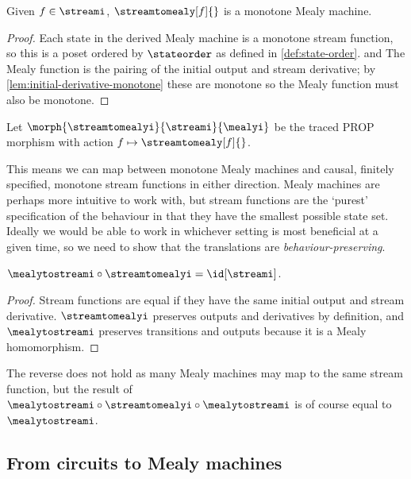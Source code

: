 \documentclass{lmcs}
\begin{document}
\begin{lem}\label{lem:stream-to-mealy-is-monotone}
    Given \(f \in \streami\), \(\streamtomealy[f]{}\) is
    a monotone Mealy machine.
\end{lem}
\begin{proof}
    Each state in the derived Mealy machine is a monotone stream function, so
    this is a poset ordered by \(\stateorder\) as defined in
    \autoref{def:state-order}. and
    The Mealy function is the pairing of the initial output and stream
    derivative; by \autoref{lem:initial-derivative-monotone} these are monotone
    so the Mealy function must also be monotone.
\end{proof}

\begin{defi}
    Let \(\morph{\streamtomealyi}{\streami}{\mealyi}\) be the traced PROP
    morphism with action \(f \mapsto \streamtomealy[f]{}\).
\end{defi}

This means we can map between monotone Mealy machines and causal, finitely
specified, monotone stream functions in either direction.
Mealy machines are perhaps more intuitive to work with, but stream functions
are the `purest' specification of the behaviour in that they have the smallest
possible state set.
Ideally we would be able to work in whichever setting is most beneficial at a
given time, so we need to show that the translations are
\emph{behaviour-preserving}.

\begin{prop}\label{prop:mealy-stream-id}
    \(\mealytostreami \circ \streamtomealyi = \id[\streami]\).
\end{prop}
\begin{proof}
    Stream functions are equal if they have the same initial output and
    stream derivative.
    \(\streamtomealyi\) preserves outputs and derivatives by definition, and
    \(\mealytostreami\) preserves transitions and outputs because it is a Mealy
    homomorphism.
\end{proof}

The reverse does not hold as many Mealy machines may map to the same stream
function, but the result of
\(\mealytostreami \circ \streamtomealyi \circ \mealytostreami\) is of course
equal to \(\mealytostreami\).

\subsection{From circuits to Mealy machines}\label{sec:synthesis}
\end{document}
